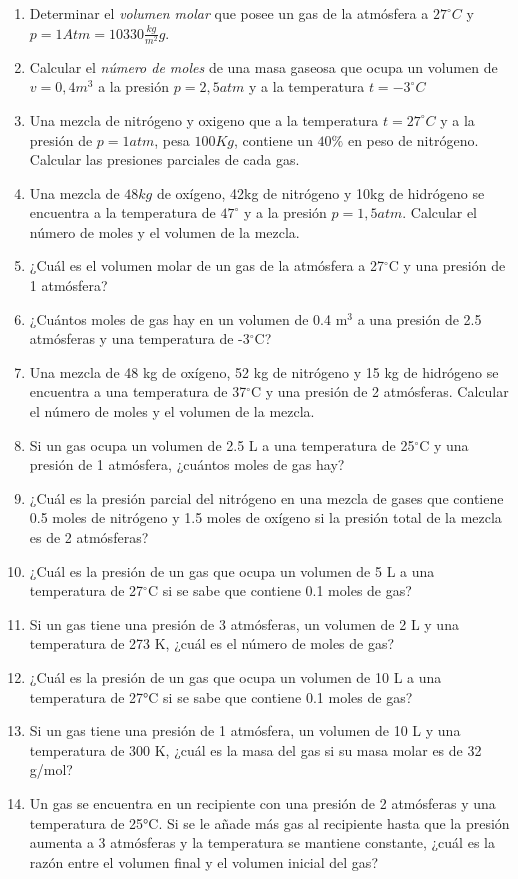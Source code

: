 \documentclass[../main]{subfiles}
\begin{document}
\begin{enumerate}
\item Determinar el \emph{volumen molar} que posee un gas de la
  atmósfera a $27^\circ C$ y $p=1Atm= 10330\frac{kg}{m^2}g$.
\item Calcular el \emph{número de moles} de una masa gaseosa que
  ocupa un volumen de $v=0,4m^3$ a la presión $p=2,5atm$ y a la
  temperatura $t=-3^\circ C$
\item Una mezcla de nitrógeno y oxigeno que a la temperatura
  $t=27^\circ C$ y a la presión de $p=1atm$, pesa $100Kg$, contiene
  un $40\%$ en peso de nitrógeno. Calcular las presiones parciales de cada gas.
\item Una mezcla de $48kg$ de oxígeno, 42kg de nitrógeno y 10kg de
  hidrógeno se encuentra a la temperatura de $47^\circ$ y a la
  presión $p=1,5atm$. Calcular el número de moles y el volumen de la mezcla.
\item ¿Cuál es el volumen molar de un gas de la atmósfera a
  27$^\circ$C y una presión de 1 atmósfera?
\item ¿Cuántos moles de gas hay en un volumen de 0.4 m$^3$ a una
  presión de 2.5 atmósferas y una temperatura de -3$^\circ$C?
\item Una mezcla de 48 kg de oxígeno, 52 kg de nitrógeno y 15 kg de
  hidrógeno se encuentra a una temperatura de 37$^\circ$C y una
  presión de 2 atmósferas. Calcular el número de moles y el volumen
  de la mezcla.
\item Si un gas ocupa un volumen de 2.5 L a una temperatura de
  25$^\circ$C y una presión de 1 atmósfera, ¿cuántos moles de gas hay?
\item ¿Cuál es la presión parcial del nitrógeno en una mezcla de
  gases que contiene 0.5 moles de nitrógeno y 1.5 moles de oxígeno si
  la presión total de la mezcla es de 2 atmósferas?
\item ¿Cuál es la presión de un gas que ocupa un volumen de 5 L a una
  temperatura de 27$^\circ$C si se sabe que contiene 0.1 moles de gas?
\item Si un gas tiene una presión de 3 atmósferas, un volumen de 2 L
  y una temperatura de 273 K, ¿cuál es el número de moles de gas?
\item ¿Cuál es la presión de un gas que ocupa un volumen de 10 L a
  una temperatura de 27°C si se sabe que contiene 0.1 moles de gas?
\item Si un gas tiene una presión de 1 atmósfera, un volumen de 10 L
  y una temperatura de 300 K, ¿cuál es la masa del gas si su masa
  molar es de 32 g/mol?
\item Un gas se encuentra en un recipiente con una presión de 2
  atmósferas y una temperatura de 25°C. Si se le añade más gas al
  recipiente hasta que la presión aumenta a 3 atmósferas y la
  temperatura se mantiene constante, ¿cuál es la razón entre el
  volumen final y el volumen inicial del gas?
\end{enumerate}
\end{document}
